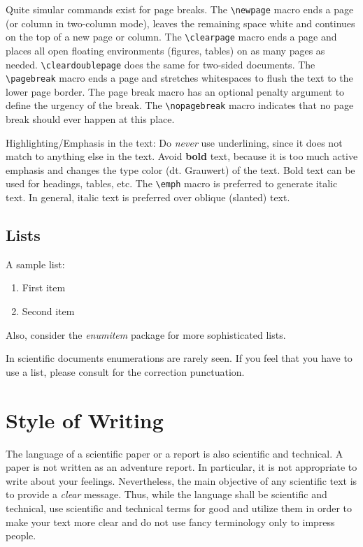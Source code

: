Quite simular commands exist for page breaks. 
The \verb|\newpage| macro ends a page (or column in two-column mode), leaves the remaining space white and continues on the top of a new page or column. 
The \verb|\clearpage| macro ends a page and places all open floating environments (figures, tables) on as many pages as needed. \verb|\cleardoublepage| does the same for two-sided documents. 
The \verb|\pagebreak| macro ends a page and stretches whitespaces to flush the text to the lower page border.  
The page break macro has an optional penalty argument to define the urgency of the break. 
The \verb|\nopagebreak| macro indicates that no page break should ever happen at this place. 

Highlighting/Emphasis in the text: 
Do \emph{never} use underlining, since it does not match to anything else in the text. 
Avoid \textbf{bold} text, because it is too much active emphasis and changes the type color (dt. Grauwert) of the text. 
Bold text can be used for headings, tables, etc.
The \verb|\emph| macro is preferred to generate italic text. 
In general, italic text is preferred  over oblique (slanted) text.

\section{Lists} %
A sample list:
\begin{enumerate}
    \item First item
    \item Second item
\end{enumerate}
Also, consider the \emph{enumitem} package for more sophisticated lists.

In scientific documents enumerations are rarely seen. 
If you feel that you have to use a list, please consult \cite{_chicago_2017} for the correction punctuation.
\clearpage


\chapter{Style of Writing} %
The language of a scientific paper or a report is also scientific and technical. 
A paper is not written as an adventure report. 
In particular, it is not appropriate to write about your feelings. 
Nevertheless, the main objective of any scientific text is to provide a \emph{clear} message. 
Thus, while the language shall be scientific and technical, use scientific and technical terms for good and utilize them in order to make your text more clear and do not use fancy terminology only to impress people.

